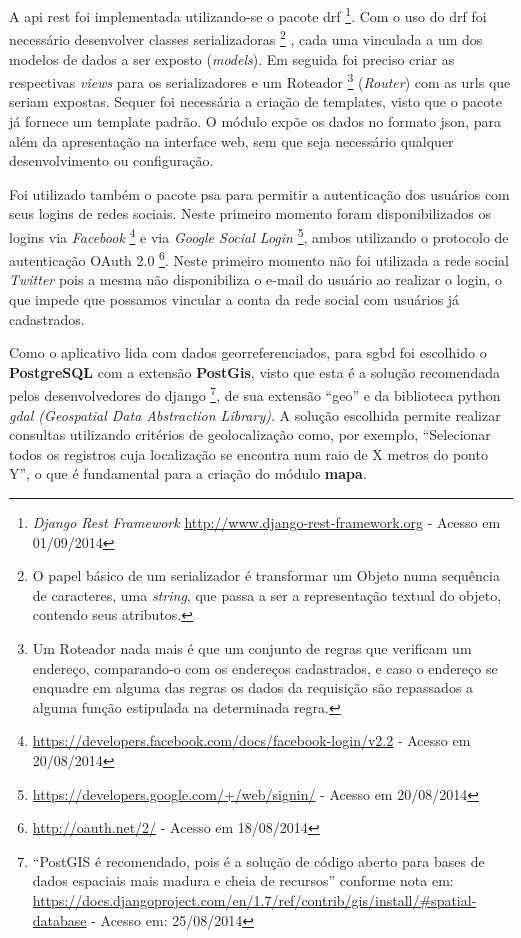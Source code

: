 A \gls{api} \gls{rest} foi implementada utilizando-se o pacote \gls{drf}%
\footnote{\textit{Django Rest Framework} \url{http://www.django-rest-framework.org} - Acesso em 01/09/2014}. Com o uso do \gls{drf} %
foi necessário desenvolver classes serializadoras%
\footnote{O papel básico de um serializador é transformar um Objeto numa sequência de caracteres, uma \textit{string}, que passa a ser a representação textual do objeto, contendo seus atributos.}%
, cada uma vinculada a um dos modelos de dados a ser exposto (\textit{models}).
Em seguida foi preciso criar as respectivas \textit{views} para os serializadores e um Roteador%
\footnote{Um Roteador nada mais é que um conjunto de regras que verificam um endereço, comparando-o com os endereços cadastrados, e caso o endereço se enquadre em alguma das regras os dados da requisição são repassados a alguma função estipulada na determinada regra.}
(\textit{Router}) com as urls que seriam expostas. Sequer foi necessária a criação de templates, visto que o pacote já fornece um template padrão. O módulo expõe os dados no formato \gls{json}, para além da apresentação na interface web, sem que seja necessário qualquer desenvolvimento ou configuração.

Foi utilizado também o pacote \gls{psa} para permitir a autenticação dos usuários com seus logins de redes sociais. Neste primeiro momento foram disponibilizados os logins via \textit{Facebook}%
\footnote{\url{https://developers.facebook.com/docs/facebook-login/v2.2} - Acesso em 20/08/2014}
e via \textit{Google Social Login}%
\footnote{\url{https://developers.google.com/+/web/signin/} - Acesso em 20/08/2014}, 
ambos utilizando o protocolo de autenticação OAuth 2.0%
\footnote{\url{http://oauth.net/2/} - Acesso em 18/08/2014}.
Neste primeiro momento não foi utilizada a rede social \textit{Twitter} pois a mesma não disponibiliza o e-mail do usuário ao realizar o login, o que impede que possamos vincular a conta da rede social com usuários já cadastrados.

Como o aplicativo lida com dados georreferenciados, para \gls{sgbd} foi escolhido o \textbf{PostgreSQL} com a extensão \textbf{PostGis}, visto que esta é a solução recomendada pelos desenvolvedores do \gls{django}%
\footnote{``PostGIS é recomendado, pois é a solução de código aberto para bases de dados espaciais mais madura e cheia de recursos'' conforme nota em: {\url{https://docs.djangoproject.com/en/1.7/ref/contrib/gis/install/\#spatial-database}} - Acesso em: 25/08/2014},
de sua extensão ``geo'' e da biblioteca python \textit{gdal (Geospatial Data Abstraction Library)}. A solução escolhida permite realizar consultas utilizando critérios de geolocalização como, por exemplo, ``Selecionar todos os registros cuja localização se encontra num raio de X metros do ponto Y'', o que é fundamental para a criação do módulo \textbf{mapa}.


